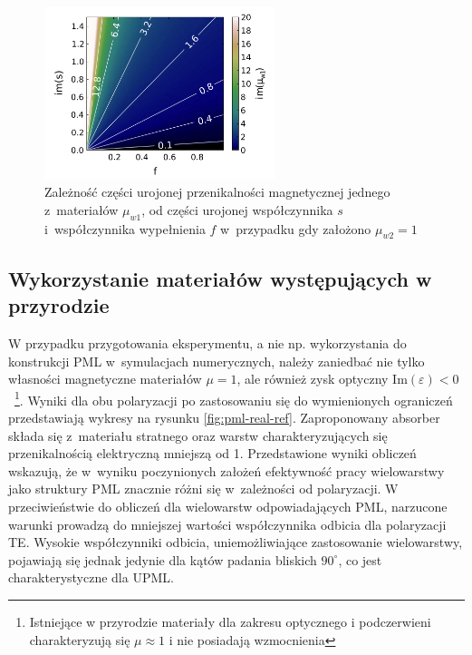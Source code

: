\begin{figure}
	\includegraphics[width=0.6\textwidth]{images/pml/fig4.png}
	\caption{Zależność części urojonej przenikalności magnetycznej jednego z~materiałów $\mu_{w1}$, od części urojonej współczynnika $s$ i~współczynnika wypełnienia $f$ w~przypadku gdy założono $\mu_{w2}=1$~\cite{ania2015}}
	\label{fig:im-mu1}
\end{figure}

\subsection{Wykorzystanie materiałów występujących w przyrodzie}

W przypadku przygotowania eksperymentu, a nie np. wykorzystania do konstrukcji PML w~symulacjach  numerycznych, należy zaniedbać nie tylko własności magnetyczne materiałów $\mu=1$, ale również zysk optyczny $\textrm{Im}(\varepsilon)<0$~\footnote{Istniejące w przyrodzie materiały dla zakresu optycznego i podczerwieni charakteryzują się $\mu \approx 1$ i nie posiadają wzmocnienia}. Wyniki dla obu polaryzacji po zastosowaniu się do wymienionych ograniczeń przedstawiają wykresy na rysunku \ref{fig:pml-real-ref}. Zaproponowany absorber składa się z~materiału stratnego oraz warstw charakteryzujących się przenikalnością elektryczną mniejszą od 1. Przedstawione wyniki obliczeń wskazują, że w~wyniku poczynionych założeń efektywność pracy wielowarstwy jako struktury PML znacznie różni się w~zależności od polaryzacji. W przeciwieństwie do obliczeń dla wielowarstw odpowiadających PML, narzucone warunki prowadzą do mniejszej wartości współczynnika odbicia dla polaryzacji TE. Wysokie współczynniki odbicia, uniemożliwiające zastosowanie wielowarstwy,  pojawiają się jednak jedynie dla kątów padania bliskich $90^{\circ}$, co jest charakterystyczne dla UPML.

